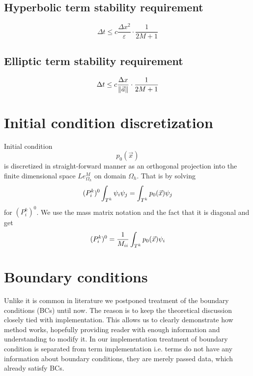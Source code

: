 \subsection{Hyperbolic term stability requirement}

\begin{equation}
	\Delta t \leq c\frac{\Delta x^2}{\varepsilon} \cdot \frac{1}{2M + 1}
\end{equation} 

\subsection{Elliptic term stability requirement}
\begin{equation}\label{eq:cfl_cond}
	\Delta t \leq c\frac{\Delta x}{\left\lVert\vec{a}\right\rVert} \cdot \frac{1}{2M + 1}
\end{equation}

\newpage
\section{Initial condition discretization}
Initial condition 
$$
p_0(\vec{x})
$$
is discretized in straight-forward manner as an orthogonal projection into the 
finite dimensional space $Le_{\Omega_h}^{M}$ on domain $\Omega_h$. That is
by solving
\begin{equation}\label{eq:init_proj}
	(P^k_i)^0\int_{T^k}\psi_i\psi_j = \int_{T^k} p_0(\vec{x})\psi_j
\end{equation}
for $(P^k_i)^0$. We use the mass matrix notation and the fact that 
it is diagonal and get
\begin{equation}
	(P^k_i)^0 = \frac{1}{M_{ii}}\int_{T^k} p_0(\vec{x})\psi_i
\end{equation}




\section{Boundary conditions}
Unlike it is common in literature we postponed treatment of the boundary 
conditions (BCs) until now. The reason is to keep the theoretical discussion 
closely tied with implementation. This allows us to clearly demonstrate how 
method works, hopefully providing reader with enough information and 
understanding to modify it. In our implementation treatment of boundary 
condition is separated from term implementation i.e. terms do not have any 
information about boundary conditions, they are merely passed data, which 
already satisfy BCs.

